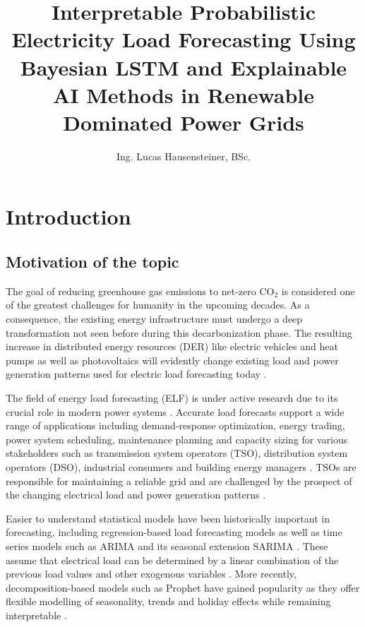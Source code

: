\documentclass[Master,english,IEEE]{twbook}
\title{Interpretable Probabilistic Electricity Load Forecasting Using Bayesian LSTM and Explainable AI Methods in Renewable Dominated Power Grids}
\author{Ing. Lucas Hausensteiner, BSc.}
\begin{document}
\maketitle

%
%
\chapter{Introduction}
\section{Motivation of the topic}
The goal of reducing greenhouse gas emissions to net-zero CO$_2$ is considered one of the greatest challenges for humanity in the upcoming decades. As a consequence, the existing energy infrastructure must undergo a deep transformation not seen before during this decarbonization phase. The resulting increase in distributed energy resources (DER) like electric vehicles and heat pumps as well as photovoltaics will evidently change existing load and power generation patterns used for electric load forecasting today \cite{hongProbabilisticEnergyForecasting2016}.

The field of energy load forecasting (ELF) is under active research due to its crucial role in modern power systems \cite{baurExplainabilityInterpretabilityElectric2024}. Accurate load forecasts support a wide range of applications including demand-response optimization, energy trading, power system scheduling, maintenance planning and capacity sizing for various stakeholders such as transmission system operators (TSO), distribution system operators (DSO), industrial consumers and building energy managers \cite{baurExplainabilityInterpretabilityElectric2024,andriopoulosShortTermElectric2021,yaprakdalMultivariateTimeSeries2023,liPowerLoadForecasting2022}. TSOs are responsible for maintaining a reliable grid and are challenged by the prospect of the changing electrical load and power generation patterns \cite{baurExplainabilityInterpretabilityElectric2024}.

Easier to understand statistical models have been historically important in forecasting, including regression-based load forecasting models as well as time series models such as ARIMA and its seasonal extension SARIMA \cite{papalexopoulosRegressionbasedApproachShortterm1990,zhangTimeSeriesForecasting2003}. These assume that electrical load can be determined by a linear combination of the previous load values and other exogenous variables \cite{andriopoulosShortTermElectric2021}. More recently, decomposition-based models such as Prophet have gained popularity as they offer flexible modelling of seasonality, trends and holiday effects while remaining interpretable \cite{bashirShortTermElectricity2022}.
\end{document}
